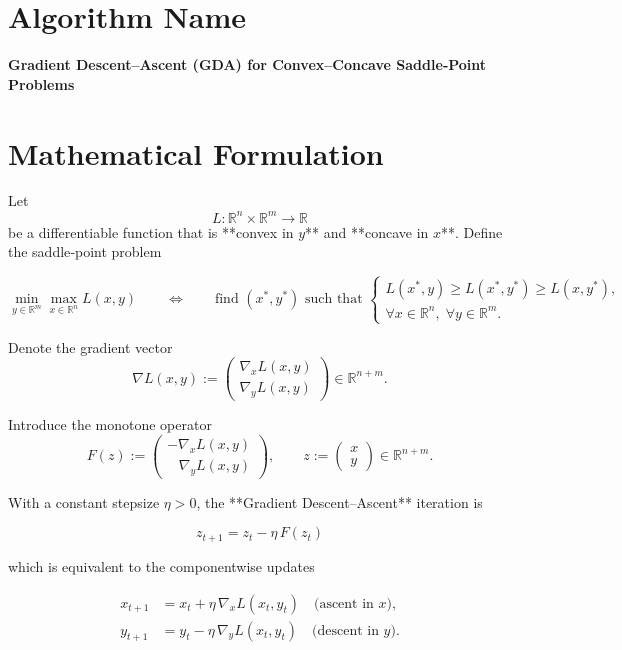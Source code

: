 \documentclass{article}
\begin{document}
\section*{Algorithm Name}
\textbf{Gradient Descent–Ascent (GDA) for Convex–Concave Saddle‑Point Problems}

\section*{Mathematical Formulation}
Let 
\[
L:\mathbb{R}^{n}\times\mathbb{R}^{m}\rightarrow\mathbb{R}
\]
be a differentiable function that is **convex in $y$** and **concave in $x$**.  
Define the saddle‑point problem  

\[
\min_{y\in\mathbb{R}^{m}}\max_{x\in\mathbb{R}^{n}} L(x,y)
\qquad\Longleftrightarrow\qquad
\text{find }(x^{*},y^{*})\text{ such that }
\begin{cases}
L(x^{*},y)\ge L(x^{*},y^{*})\ge L(x,y^{*}),\\[2mm]
\forall x\in\mathbb{R}^{n},\; \forall y\in\mathbb{R}^{m}.
\end{cases}
\]

Denote the gradient vector
\[
\nabla L(x,y):=
\begin{pmatrix}
\nabla_{x}L(x,y)\\[1mm]
\nabla_{y}L(x,y)
\end{pmatrix}
\in\mathbb{R}^{n+m}.
\]

Introduce the monotone operator  
\[
F(z):=
\begin{pmatrix}
-\nabla_{x}L(x,y)\\[1mm]
\;\;\;\nabla_{y}L(x,y)
\end{pmatrix},
\qquad
z:=\begin{pmatrix}x\\y\end{pmatrix}\in\mathbb{R}^{n+m}.
\]

With a constant stepsize $\eta>0$, the **Gradient Descent–Ascent** iteration is

\[
\boxed{\,z_{t+1}=z_{t}-\eta\,F(z_{t})\,}
\tag{1}
\]

which is equivalent to the componentwise updates  

\[
\begin{aligned}
x_{t+1}&=x_{t}+\eta\,\nabla_{x}L(x_{t},y_{t})\quad\text{(ascent in $x$)},\\[1mm]
y_{t+1}&=y_{t}-\eta\,\nabla_{y}L(x_{t},y_{t})\quad\text{(descent in $y$)}.
\end{aligned}
\tag{2}
\]
\end{document}
